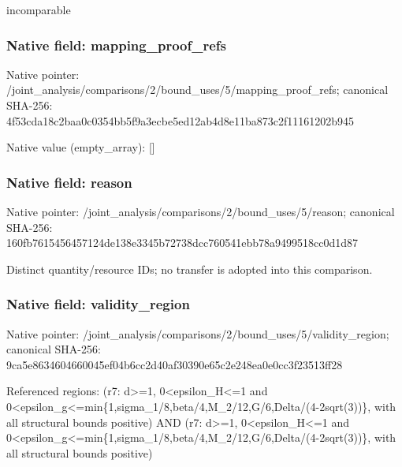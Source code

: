 \documentclass[10pt,a4paper]{article}
\begin{document}
\begingroup\raggedright\sloppy incomparable\par\endgroup

\subsubsection{Native field: mapping\_\allowbreak{}proof\_\allowbreak{}refs}
Native pointer: /joint\_\allowbreak{}analysis/comparisons/2/bound\_\allowbreak{}uses/5/mapping\_\allowbreak{}proof\_\allowbreak{}refs; canonical SHA-256: 4f53cda18c2baa0c0354bb5f9a3ecbe5ed12ab4d8e11ba873c2f11161202b945

Native value (empty\_\allowbreak{}array): []

\subsubsection{Native field: reason}
Native pointer: /joint\_\allowbreak{}analysis/comparisons/2/bound\_\allowbreak{}uses/5/reason; canonical SHA-256: 160fb7615456457124de138e3345b72738dcc760541ebb78a9499518cc0d1d87

\begingroup\raggedright\sloppy Distinct quantity/\allowbreak{}resource IDs;\allowbreak{} no transfer is adopted into this comparison.\par\endgroup

\subsubsection{Native field: validity\_\allowbreak{}region}
Native pointer: /joint\_\allowbreak{}analysis/comparisons/2/bound\_\allowbreak{}uses/5/validity\_\allowbreak{}region; canonical SHA-256: 9ca5e8634604660045ef04b6cc2d40af30390e65c2e248ea0e0cc3f23513ff28

\begingroup\raggedright\sloppy Referenced regions:\allowbreak{} (r7:\allowbreak{} d>=\allowbreak{}1,\allowbreak{} 0<epsilon\_\allowbreak{}H<=\allowbreak{}1 and 0<epsilon\_\allowbreak{}g<=\allowbreak{}min\{1,\allowbreak{}sigma\_\allowbreak{}1/\allowbreak{}8,\allowbreak{}beta/\allowbreak{}4,\allowbreak{}M\_\allowbreak{}2/\allowbreak{}12,\allowbreak{}G/\allowbreak{}6,\allowbreak{}Delta/\allowbreak{}(4-2sqrt(3))\},\allowbreak{} with all structural bounds positive) AND (r7:\allowbreak{} d>=\allowbreak{}1,\allowbreak{} 0<epsilon\_\allowbreak{}H<=\allowbreak{}1 and 0<epsilon\_\allowbreak{}g<=\allowbreak{}min\{1,\allowbreak{}sigma\_\allowbreak{}1/\allowbreak{}8,\allowbreak{}beta/\allowbreak{}4,\allowbreak{}M\_\allowbreak{}2/\allowbreak{}12,\allowbreak{}G/\allowbreak{}6,\allowbreak{}Delta/\allowbreak{}(4-2sqrt(3))\},\allowbreak{} with all structural bounds positive)\par\endgroup
\end{document}
